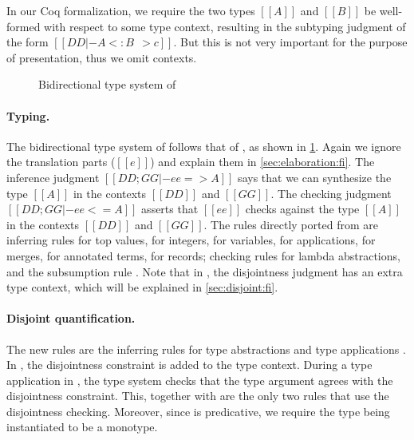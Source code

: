 \begin{remark}
  In our Coq formalization, we require the two types $[[A]]$ and $[[B]]$ be
  well-formed with respect to some type context, resulting in the subtyping
  judgment of the form $[[DD |- A <: B ~~> c]]$. But this is not very important
  for the purpose of presentation, thus we omit contexts.
\end{remark}


\begin{figure}[t]
  \centering
  \caption{Bidirectional type system of \fnamee}
  \label{fig:typing:fi}
\end{figure}


\paragraph{Typing.}

The bidirectional type system of \fnamee follows that of \fname, as shown
in \cref{fig:typing:fi}. Again we ignore the translation parts ($[[e]]$) and explain them in
\cref{sec:elaboration:fi}. The inference judgment $[[ DD; GG |- ee => A  ]]$
says that we can synthesize the type $[[A]]$ in the contexts $[[DD]]$ and $[[GG]]$. The checking judgment
$[[ DD ; GG |- ee <= A  ]]$ asserts that $[[ee]]$ checks against the type $[[A]]$
in the contexts $[[DD]]$ and $[[GG]]$. The rules directly ported from \namee are inferring rules  for top values,
 for integers,  for variables,  for applications,  for merges,
 for annotated terms,  for records; checking rules  for lambda abstractions, and
the subsumption rule . Note that in , the disjointness judgment has an extra type context, which will be
explained in \cref{sec:disjoint:fi}.

\paragraph{Disjoint quantification.}

The new rules are the inferring rules for type abstractions  and
type applications . In , the disjointness
constraint is added to the type context. During a type application in
, the type system checks that the type argument agrees with the
disjointness constraint. This, together with  are the only two
rules that use the disjointness checking. Moreover, since \fnamee is
predicative, we require the type being instantiated to be a monotype.



